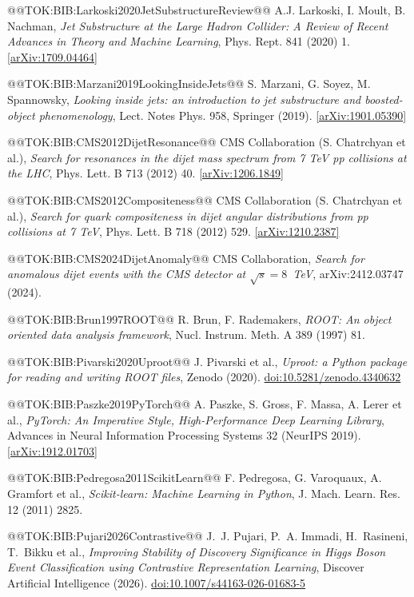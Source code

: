 \documentclass{article}
\begin{document}
@@TOK:BIB:Larkoski2020JetSubstructureReview@@ A.J. Larkoski, I. Moult, B. Nachman,
\emph{Jet Substructure at the Large Hadron Collider: A Review of Recent Advances in Theory and Machine Learning},
Phys. Rept. 841 (2020) 1. \href{https://arxiv.org/abs/1709.04464}{[arXiv:1709.04464]}

@@TOK:BIB:Marzani2019LookingInsideJets@@ S. Marzani, G. Soyez, M. Spannowsky,
\emph{Looking inside jets: an introduction to jet substructure and boosted-object phenomenology},
Lect. Notes Phys. 958, Springer (2019). \href{https://arxiv.org/abs/1901.05390}{[arXiv:1901.05390]}

@@TOK:BIB:CMS2012DijetResonance@@ CMS Collaboration (S. Chatrchyan et al.),
\emph{Search for resonances in the dijet mass spectrum from 7 TeV pp collisions at the LHC},
Phys. Lett. B 713 (2012) 40. \href{https://arxiv.org/abs/1206.1849}{[arXiv:1206.1849]}

@@TOK:BIB:CMS2012Compositeness@@ CMS Collaboration (S. Chatrchyan et al.),
\emph{Search for quark compositeness in dijet angular distributions from pp collisions at 7 TeV},
Phys. Lett. B 718 (2012) 529. \href{https://arxiv.org/abs/1210.2387}{[arXiv:1210.2387]}

@@TOK:BIB:CMS2024DijetAnomaly@@ CMS Collaboration,
\emph{Search for anomalous dijet events with the CMS detector at $\sqrt{s}=8$~TeV},
arXiv:2412.03747 (2024).

@@TOK:BIB:Brun1997ROOT@@ R. Brun, F. Rademakers,
\emph{ROOT: An object oriented data analysis framework},
Nucl. Instrum. Meth. A 389 (1997) 81.

@@TOK:BIB:Pivarski2020Uproot@@ J. Pivarski et al.,
\emph{Uproot: a Python package for reading and writing ROOT files},
Zenodo (2020). \href{https://doi.org/10.5281/zenodo.4340632}{doi:10.5281/zenodo.4340632}

@@TOK:BIB:Paszke2019PyTorch@@ A. Paszke, S. Gross, F. Massa, A. Lerer et al.,
\emph{PyTorch: An Imperative Style, High-Performance Deep Learning Library},
Advances in Neural Information Processing Systems 32 (NeurIPS 2019). \href{https://arxiv.org/abs/1912.01703}{[arXiv:1912.01703]}

@@TOK:BIB:Pedregosa2011ScikitLearn@@ F. Pedregosa, G. Varoquaux, A. Gramfort et al.,
\emph{Scikit-learn: Machine Learning in Python},
J. Mach. Learn. Res. 12 (2011) 2825.

@@TOK:BIB:Pujari2026Contrastive@@ J.~J. Pujari, P.~A. Immadi, H.~Rasineni, T.~Bikku et al.,
\emph{Improving Stability of Discovery Significance in Higgs Boson Event Classification using Contrastive Representation Learning},
Discover Artificial Intelligence (2026). \href{https://doi.org/10.1007/s44163-026-01683-5}{doi:10.1007/s44163-026-01683-5}
\end{document}
